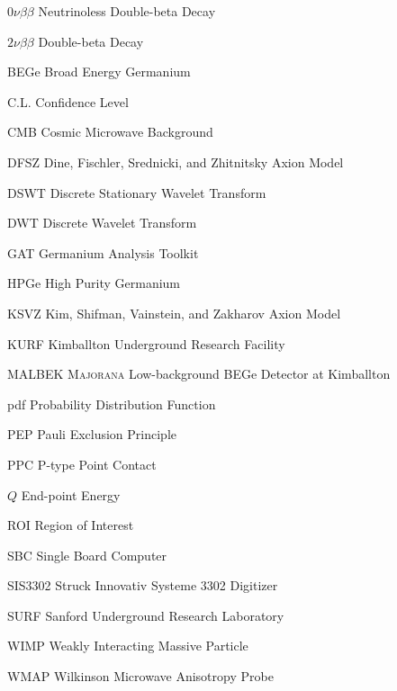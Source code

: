 \documentclass[openany, 12pt]{book}
\begin{document}
\maketableofcontents

\maketablelist

\makefigurelist

\begin{AbbrevList}
    \item[$0\nu\beta\beta$] Neutrinoless Double-beta Decay
    \item[$2\nu\beta\beta$] Double-beta Decay 
	\item[BEGe] Broad Energy Germanium
    \item[C.L.] Confidence Level
    \item[CMB] Cosmic Microwave Background
    \item[DFSZ] Dine, Fischler, Srednicki, and Zhitnitsky Axion Model 
    \item[DSWT] Discrete Stationary Wavelet Transform
    \item[DWT] Discrete Wavelet Transform
    \item[GAT] Germanium Analysis Toolkit
	\item[HPGe] High Purity Germanium
    \item[KSVZ] Kim, Shifman, Vainstein, and Zakharov Axion Model
	\item[KURF] Kimballton Underground Research Facility
	\item[MALBEK] \textsc{Majorana} Low-background BEGe Detector at Kimballton
    \item[pdf] Probability Distribution Function
    \item[PEP] Pauli Exclusion Principle
	\item[PPC] P-type Point Contact
    \item[$Q$] End-point Energy
    \item[ROI] Region of Interest
    \item[SBC] Single Board Computer
    \item[SIS3302] Struck Innovativ Systeme 3302 Digitizer
    \item[SURF] Sanford Underground Research Laboratory
	\item[WIMP] Weakly Interacting Massive Particle
    \item[WMAP] Wilkinson Microwave Anisotropy Probe
\end{AbbrevList}

\mainmatter






\end{document}
